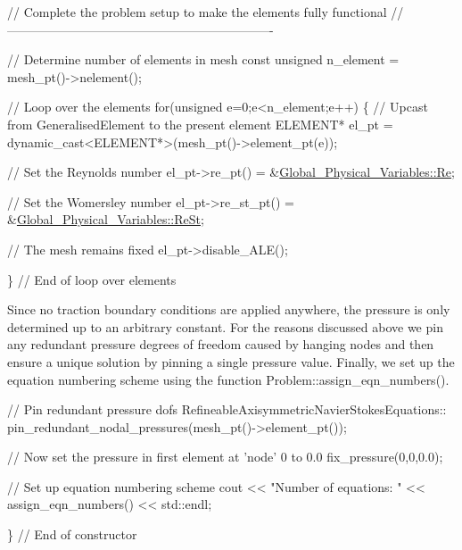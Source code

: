 \begin{DoxyCodeInclude}
 \textcolor{comment}{// Complete the problem setup to make the elements fully functional}
 \textcolor{comment}{// ----------------------------------------------------------------}

 \textcolor{comment}{// Determine number of elements in mesh}
 \textcolor{keyword}{const} \textcolor{keywordtype}{unsigned} n\_element = mesh\_pt()->nelement();

 \textcolor{comment}{// Loop over the elements}
 \textcolor{keywordflow}{for}(\textcolor{keywordtype}{unsigned} e=0;e<n\_element;e++)
  \{
   \textcolor{comment}{// Upcast from GeneralisedElement to the present element}
   ELEMENT* el\_pt = \textcolor{keyword}{dynamic\_cast<}ELEMENT*\textcolor{keyword}{>}(mesh\_pt()->element\_pt(e));

   \textcolor{comment}{// Set the Reynolds number}
   el\_pt->re\_pt() = &\hyperlink{namespaceGlobal__Physical__Variables_ab814e627d2eb5bc50318879d19ab16b9}{Global\_Physical\_Variables::Re};

   \textcolor{comment}{// Set the Womersley number}
   el\_pt->re\_st\_pt() = &\hyperlink{namespaceGlobal__Physical__Variables_a085ee4bf968ffdd01a41b8c41864f907}{Global\_Physical\_Variables::ReSt};

   \textcolor{comment}{// The mesh remains fixed}
   el\_pt->disable\_ALE();

  \} \textcolor{comment}{// End of loop over elements}

\end{DoxyCodeInclude}


Since no traction boundary conditions are applied anywhere, the pressure is only determined up to an arbitrary constant. For the reasons discussed above we pin any redundant pressure degrees of freedom caused by hanging nodes and then ensure a unique solution by pinning a single pressure value. Finally, we set up the equation numbering scheme using the function {\ttfamily Problem\+::assign\+\_\+eqn\+\_\+numbers()}.


\begin{DoxyCodeInclude}
 \textcolor{comment}{// Pin redundant pressure dofs}
 RefineableAxisymmetricNavierStokesEquations::
  pin\_redundant\_nodal\_pressures(mesh\_pt()->element\_pt());
 
 \textcolor{comment}{// Now set the pressure in first element at 'node' 0 to 0.0}
 fix\_pressure(0,0,0.0);
 
 \textcolor{comment}{// Set up equation numbering scheme}
 cout << \textcolor{stringliteral}{"Number of equations: "} << assign\_eqn\_numbers() << std::endl; 
 
\} \textcolor{comment}{// End of constructor}

\end{DoxyCodeInclude}




